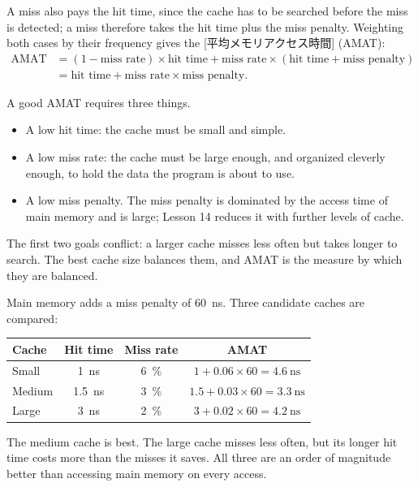 \documentclass[../main.tex]{subfiles}
\begin{document}
A miss also pays the hit time, since the cache has to be searched before the
miss is detected; a miss therefore takes the hit time plus the miss penalty.
Weighting both cases by their frequency gives the
[平均メモリアクセス時間]%
 (AMAT):
\begin{equation}
  \begin{aligned}
    \text{AMAT}
    &= (1-\text{miss rate}) \times \text{hit time}
       + \text{miss rate} \times (\text{hit time} + \text{miss penalty}) \\
    &= \text{hit time} + \text{miss rate} \times \text{miss penalty} .
  \end{aligned}
  \label{eq:l12-amat}
\end{equation}

A good AMAT requires three things.
\begin{itemize}
  \item A low hit time: the cache must be small and simple.
  \item A low miss rate: the cache must be large enough, and organized
    cleverly enough, to hold the data the program is about to use.
  \item A low miss penalty.  The miss penalty is dominated by the access time
    of main memory and is large; Lesson 14 reduces it with further levels of
    cache.
\end{itemize}
The first two goals conflict: a larger cache misses less often but takes
longer to search.  The best cache size balances them, and AMAT is the
measure by which they are balanced.

\begin{example}
  \label{ex:l12-amat}
  Main memory adds a miss penalty of
  \SI{60}{\nano\second}.  Three candidate
  caches are compared:
  \begin{center}\small
    \begin{tabular}{@{}lccc@{}}
      \toprule
      Cache & Hit time & Miss rate & AMAT \\
      \midrule
      Small  & \SI{1}{\nano\second}   & \SI{6}{\percent} & $1 + 0.06\times 60 = \SI{4.6}{\nano\second}$ \\
      Medium & \SI{1.5}{\nano\second} & \SI{3}{\percent} & $1.5 + 0.03\times 60 = \SI{3.3}{\nano\second}$ \\
      Large  & \SI{3}{\nano\second}   & \SI{2}{\percent} & $3 + 0.02\times 60 = \SI{4.2}{\nano\second}$ \\
      \bottomrule
    \end{tabular}
  \end{center}
  The medium cache is best.  The large cache misses less often, but its
  longer hit time costs more than the misses it saves.
  All three are an order of magnitude better than accessing main memory on
  every access.
\end{example}
\end{document}
